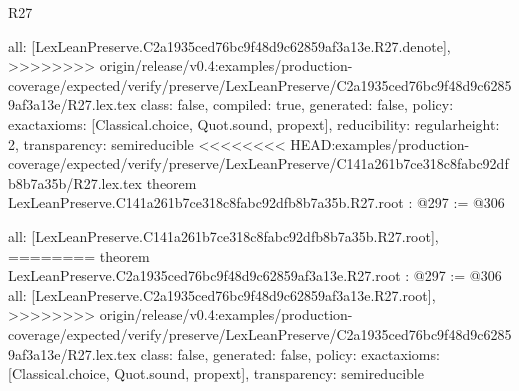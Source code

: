 \begin{lexlean}{R27}
\begin{coremodule}
{{{{{  all: [LexLeanPreserve.C2a1935ced76bc9f48d9c62859af3a13e.R27.denote],
>>>>>>>> origin/release/v0.4:examples/production-coverage/expected/verify/preserve/LexLeanPreserve/C2a1935ced76bc9f48d9c62859af3a13e/R27.lex.tex
  class: false,
  compiled: true,
  generated: false,
  policy: exact{axioms: [Classical.choice, Quot.sound, propext]},
  reducibility: regular{height: 2},
  transparency: semireducible
}
<<<<<<<< HEAD:examples/production-coverage/expected/verify/preserve/LexLeanPreserve/C141a261b7ce318c8fabc92dfb8b7a35b/R27.lex.tex
theorem LexLeanPreserve.C141a261b7ce318c8fabc92dfb8b7a35b.R27.root : @297 := @306 {
  all: [LexLeanPreserve.C141a261b7ce318c8fabc92dfb8b7a35b.R27.root],
========
theorem LexLeanPreserve.C2a1935ced76bc9f48d9c62859af3a13e.R27.root : @297 := @306 {
  all: [LexLeanPreserve.C2a1935ced76bc9f48d9c62859af3a13e.R27.root],
>>>>>>>> origin/release/v0.4:examples/production-coverage/expected/verify/preserve/LexLeanPreserve/C2a1935ced76bc9f48d9c62859af3a13e/R27.lex.tex
  class: false,
  generated: false,
  policy: exact{axioms: [Classical.choice, Quot.sound, propext]},
  transparency: semireducible
}

}}}}}
\end{coremodule}
\end{lexlean}
